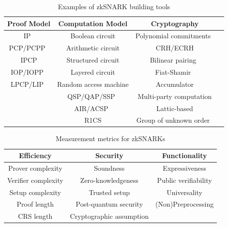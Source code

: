 \documentclass[acmtog]{acmart}
\begin{document}
\begin{table}[tb]
	\caption{Examples of zkSNARK building tools}
	\label{tab:build.tool}
	\centering

	\begin{tabular}{cccc}
	\hline

	\hline
	\textbf{Proof Model} & \textbf{Computation Model} & \textbf{Cryptography}\\
	\hline
		IP~\cite{GoldwasserMR85}       & Boolean circuit                  & Polynomial commitments~\cite{KateZG10} \\
		PCP/PCPP~\cite{BabaiFLS91}     & Arithmetic circuit               & CRH/ECRH \\
		IPCP                           & Structured circuit               & Bilinear pairing~\cite{BonehF01} \\
		IOP/IOPP~\cite{Ben-SassonCS16} & Layered circuit                  & Fiat-Shamir~\cite{FiatS86} \\
		LPCP/LIP~\cite{BitanskyCIPO13} & Random access machine            & Accumulator \\
		                               & QSP/QAP/SSP~\cite{GennaroGP013}  & Multi-party computation \\
		                               & AIR/ACSP~\cite{Ben-SassonBHR18}  & Lattic-based \\
		                               & R1CS                             & Group of unknown order~\cite{BunzFS20} \\
	\hline

	\hline
	\end{tabular}
\end{table}

\begin{table}[tb]
	\caption{Measurement metrics for zkSNARKs}
	\label{tab:measure}
	\centering

	\begin{tabular}{ccc}
	\hline

	\hline
	\textbf{Efficiency} & \textbf{Security} & \textbf{Functionality} \\
	\hline
		Prover complexity & Soundness & Expressiveness  \\
		Verifier complexity & Zero-knowledgeness & Public verifiability \\
		Setup complexity & Trusted setup & Universality \\
		Proof length & Post-quantum security & (Non)Preprocessing \\
		CRS length & Cryptographic assumption & \\
	\hline

	\hline
	\end{tabular}
\end{table}
\end{document}
